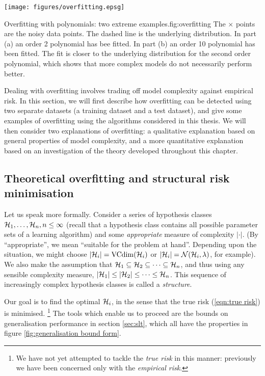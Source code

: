 \begin{linefigure}
\begin{center}
\texttt{[image: figures/overfitting.epsg]}
\end{center}
\begin{capt}{Overfitting with polynomials: two extreme examples.}{fig:overfitting}
The $\times$ points are the noisy data points.  The dashed line is the
underlying distribution.  In part (a) an order 2 polynomial has bee
fitted.  In part (b) an order 10 polynomial has been fitted.  The fit
is closer to the underlying distribution for the second order
polynomial, which shows that more complex models do not necessarily
perform better.
\end{capt}
\end{linefigure}

Dealing with overfitting involves trading off model complexity against
empirical risk.  In this section, we will first describe how
overfitting can be detected using two separate datasets (a training
dataset and a test dataset), and give some examples of overfitting
using the algorithms considered in this thesis.  We will then consider
two explanations of overfitting: a qualitative explanation based on
general properties of model complexity, and a more quantitative
explanation based on an investigation of the theory developed
throughout this chapter.


\subsection{Theoretical overfitting and structural risk minimisation}
\label{sec:theoretical overfitting}
\label{acr:srm}

Let us speak more formally.  Consider a series of hypothesis
classes $\mathcal{H}_1, \ldots, \mathcal{H}_n, n \leq \infty$ (recall that a
hypothesis class contains all possible parameter sets of a learning
algorithm) and some \emph{appropriate} measure of complexity
$|\cdot|$.  (By ``appropriate'', we mean ``suitable for the problem at
hand''. Depending upon the situation, we might choose $|\mathcal{H}_i| =
\mathrm{VCdim}(\mathcal{H}_i)$ or $|\mathcal{H}_i| = \mathcal{N}({\mathcal{H}_i}, {\lambda})$, for
example).  We also make the assumption that $\mathcal{H}_1 \subseteq \mathcal{H}_2
\subseteq \cdots \subseteq \mathcal{H}_n$, and thus using any sensible
complexity measure, $|\mathcal{H}_1| \leq |\mathcal{H}_2| \leq \cdots \leq
\mathcal{H}_n$.  This sequence of increasingly complex hypothesis
classes is called a \emph{structure}.

Our goal is to find the optimal $\mathcal{H}_i$, in the sense that the
true risk (\ref{eqn:true risk}) is minimised.
\footnote{We have not yet attempted to tackle the \emph{true risk} in
this manner: previously we have been concerned only with the
\emph{empirical risk}.}
The tools which enable us to proceed are the bounds on generalisation
performance in section \ref{sec:slt}, which all have the properties
in figure \ref{fig:generalisation bound form}.

